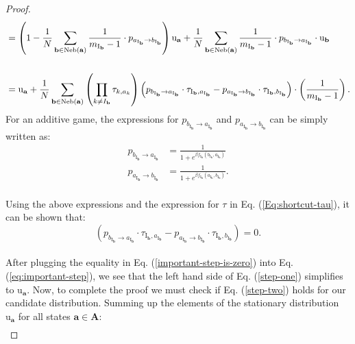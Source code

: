 \documentclass[11pt]{article}
\theoremstyle{plainCl1}
\theoremstyle{plainCl2}
\newcommand{\A}{\mathbf{A}}
\newcommand{\abf}{\mathbf{a}}
\newcommand{\bbf}{\mathbf{b}}
\begin{document}
\begin{proof}
\begin{align}
&= \left( 1 - \frac{1}{N} \sum_{\bbf \in \mathrm{Neb}(\abf)} \frac{1}{m_{\mathrm{I}_\bbf}-1} \cdot p_{a_{\mathrm{I}_\bbf} \to b_{\mathrm{I}_\bbf}} \right) \mathrm{u}_{\abf}+ \frac{1}{N}\sum_{\bbf \in \mathrm{Neb}(\abf)}  \frac{1}{m_{\mathrm{I}_\bbf}-1} \cdot p_{b_{\mathrm{I}_\bbf} \to a_{\mathrm{I}_\bbf}} \cdot \mathrm{u}_{\bbf}\\ \notag \\
\label{eq:important-step}
&= \mathrm{u}_\abf +  \frac{1}{N} \sum_{\bbf \in \mathrm{Neb}(\abf)} \left( \prod_{k \neq I_\bbf} \tau_{k,a_k} \right) \left( p_{b_{\mathrm{I}_\bbf} \to a_{\mathrm{I}_\bbf}} \cdot \tau_{\mathrm{I}_\bbf, a_{\mathrm{I}_\bbf}} -  p_{a_{\mathrm{I}_\bbf} \to b_{\mathrm{I}_\bbf}} \cdot \tau_{\mathrm{I}_\bbf, b_{\mathrm{I}_\bbf}} \right) \cdot \left(  \frac{1}{m_{\mathrm{I}_\bbf}-1} \right) .
\end{align}
\noindent For an additive game, the expressions for $p_{b_{\mathrm{I}_\bbf} \to a_{\mathrm{I}_\bbf}}$ and $p_{a_{\mathrm{I}_\bbf} \to b_{\mathrm{I}_\bbf}}$ can be simply written as: 
\begin{align}
p_{b_{\mathrm{I}_\bbf} \to a_{\mathrm{I}_\bbf}} &=\frac{1}{1 + \displaystyle e^{\beta f_{\mathrm{I}_\bbf}(b_{\mathrm{I}_\bbf}, a_{\mathrm{I}_\bbf})}} \\[10pt] 
p_{a_{\mathrm{I}_\bbf} \to b_{\mathrm{I}_\bbf}} &= \frac{1}{1 + \displaystyle e^{\beta f_{\mathrm{I}_\bbf}(a_{\mathrm{I}_\bbf}, b_{\mathrm{I}_\bbf})}} .
\end{align} \\
Using the above expressions and the expression for $\tau$ in Eq. (\ref{Eq:shortcut-tau}), it can be shown that: 
\begin{equation}
 \left( p_{b_{\mathrm{I}_\bbf} \to a_{\mathrm{I}_\bbf}} \cdot \tau_{\mathrm{I}_\bbf, a_{\mathrm{I}_\bbf}} -  p_{a_{\mathrm{I}_\bbf} \to b_{\mathrm{I}_\bbf}} \cdot \tau_{\mathrm{I}_\bbf, b_{\mathrm{I}_\bbf}} \right) = 0 .
\label{important-step-is-zero}
\end{equation}
\\ \noindent After plugging the equality in Eq. (\ref{important-step-is-zero}) into Eq. (\ref{eq:important-step}), we see that the left hand side of Eq. (\ref{step-one}) simplifies to $\mathrm{u}_{\abf}$. Now, to complete the proof we must check if Eq. (\ref{step-two}) holds for our candidate distribution. Summing up the elements of the stationary distribution $\mathrm{u}_\abf$ for all states $\abf \in \A$: \\ 
\begin{align}

\end{align}
\end{proof}
\end{document}
